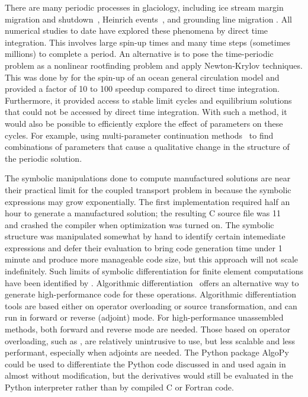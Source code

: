 There are many periodic processes in glaciology, including ice stream margin migration and shutdown~\citep{raymond2000energy,bueler2009shallow}, Heinrich events~\citep{heinrich1988cyclic,calov2010heino}, and grounding line migration \citep{schoof2007isg,mismip}.
All numerical studies to date have explored these phenomena by direct time integration.
This involves large spin-up times and many time steps (sometimes millions) to complete a period.
An alternative is to pose the time-periodic problem as a nonlinear rootfinding problem and apply Newton-Krylov techniques.
This was done by \citep{merlis2008fast} for the spin-up of an ocean general circulation model and provided a factor of 10 to 100 speedup compared to direct time integration.
Furthermore, it provided access to stable limit cycles and equilibrium solutions that could not be accessed by direct time integration.
With such a method, it would also be possible to efficiently explore the effect of parameters on these cycles.
For example, using multi-parameter continuation methods~\citep{allgower2003inc} to find combinations of parameters that cause a qualitative change in the structure of the periodic solution.




The symbolic manipulations done to compute manufactured solutions are near their practical limit for the coupled transport problem in  because the symbolic expressions may grow exponentially.
The first implementation required half an hour to generate a manufactured solution; the resulting C source file was \SI{11}{\mega\byte} and crashed the compiler when optimization was turned on.
The symbolic structure was manipulated somewhat by hand to identify certain intemediate expressions and defer their evaluation to bring code generation time under 1 minute and produce more manageable code size, but this approach will not scale indefinitely.
Such limits of symbolic differentiation for finite element computations have been identified by \citet{wang1986finger,fritzson1992need,korelc1997automatic,korelc2002multi,wriggers2008nonlinear}.
Algorithmic differentiation~\citet{griewank2003mathematical,griewank2008evaluating} offers an alternative way to generate high-performance code for these operations.
Algorithmic differentiation tools are based either on operator overloading or source transformation, and can run in forward or reverse (adjoint) mode.
For high-performance unassembled methods, both forward and reverse mode are needed.
Those based on operator overloading, such as \citet{griewank1996adol,griewank1999adol,algopy-web}, are relatively unintrusive to use, but less scalable and less performant, especially when adjoints are needed.
The Python package AlgoPy~\citep{algopy-web,walter2010algorithmic} could be used to differentiate the Python code discussed in  and used again in  almost without modification, but the derivatives would still be evaluated in the Python interpreter rather than by compiled C or Fortran code.

